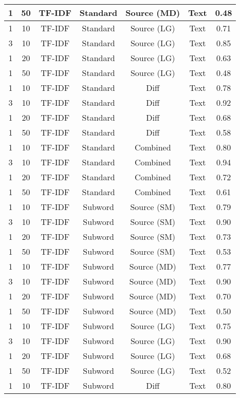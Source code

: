 \begin{longtable}{|c|c|c|c|c|c|c|}
1 & 50 & TF-IDF & Standard & Source (MD) & Text & 0.48 \\
\hline
1 & 10 & TF-IDF & Standard & Source (LG) & Text & 0.71 \\
\hline
3 & 10 & TF-IDF & Standard & Source (LG) & Text & 0.85 \\
\hline
1 & 20 & TF-IDF & Standard & Source (LG) & Text & 0.63 \\
\hline
1 & 50 & TF-IDF & Standard & Source (LG) & Text & 0.48 \\
\hline
1 & 10 & TF-IDF & Standard & Diff & Text & 0.78 \\
\hline
3 & 10 & TF-IDF & Standard & Diff & Text & 0.92 \\
\hline
1 & 20 & TF-IDF & Standard & Diff & Text & 0.68 \\
\hline
1 & 50 & TF-IDF & Standard & Diff & Text & 0.58 \\
\hline
1 & 10 & TF-IDF & Standard & Combined & Text & 0.80 \\
\hline
3 & 10 & TF-IDF & Standard & Combined & Text & 0.94 \\
\hline
1 & 20 & TF-IDF & Standard & Combined & Text & 0.72 \\
\hline
1 & 50 & TF-IDF & Standard & Combined & Text & 0.61 \\
\hline
1 & 10 & TF-IDF & Subword & Source (SM) & Text & 0.79 \\
\hline
3 & 10 & TF-IDF & Subword & Source (SM) & Text & 0.90 \\
\hline
1 & 20 & TF-IDF & Subword & Source (SM) & Text & 0.73 \\
\hline
1 & 50 & TF-IDF & Subword & Source (SM) & Text & 0.53 \\
\hline
1 & 10 & TF-IDF & Subword & Source (MD) & Text & 0.77 \\
\hline
3 & 10 & TF-IDF & Subword & Source (MD) & Text & 0.90 \\
\hline
1 & 20 & TF-IDF & Subword & Source (MD) & Text & 0.70 \\
\hline
1 & 50 & TF-IDF & Subword & Source (MD) & Text & 0.50 \\
\hline
1 & 10 & TF-IDF & Subword & Source (LG) & Text & 0.75 \\
\hline
3 & 10 & TF-IDF & Subword & Source (LG) & Text & 0.90 \\
\hline
1 & 20 & TF-IDF & Subword & Source (LG) & Text & 0.68 \\
\hline
1 & 50 & TF-IDF & Subword & Source (LG) & Text & 0.52 \\
\hline
1 & 10 & TF-IDF & Subword & Diff & Text & 0.80 \\

\end{longtable}

